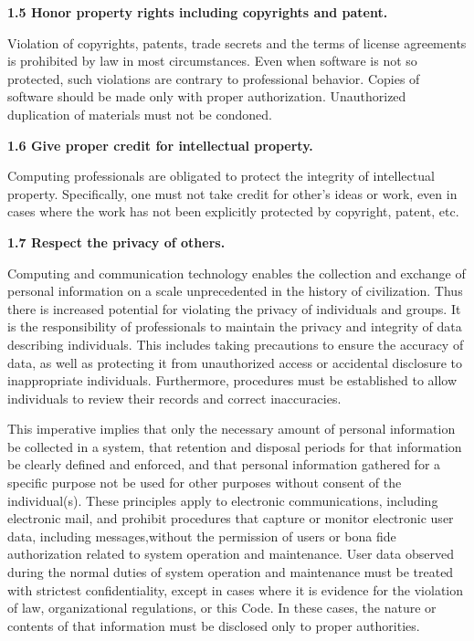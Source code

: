 \vspace{.1in}\noindent\textbf{1.5 Honor property rights including copyrights and patent.}

Violation of copyrights, patents, trade secrets and the terms of license agreements is prohibited by law in most circumstances. Even when software is not so protected, such violations are contrary to professional behavior. Copies of software should be made only with proper authorization. Unauthorized duplication of materials must not be condoned.

\vspace{.1in}\noindent\textbf{1.6 Give proper credit for intellectual property.}

Computing professionals are obligated to protect the integrity of intellectual property. Specifically, one must not take credit for other's ideas or work, even in cases where the work has not been explicitly protected by copyright, patent, etc.

\vspace{.1in}\noindent\textbf{1.7 Respect the privacy of others.}

Computing and communication technology enables the collection and exchange of personal information on a scale unprecedented in the history of civilization. Thus there is increased potential for violating the privacy of individuals and groups. It is the responsibility of professionals to maintain the privacy and integrity of data describing individuals. This includes taking precautions to ensure the accuracy of data, as well as protecting it from unauthorized access or accidental disclosure to inappropriate individuals. Furthermore, procedures must be established to allow individuals to review their records and correct inaccuracies.

This imperative implies that only the necessary amount of personal information be collected in a system, that retention and disposal periods for that information be clearly defined and enforced, and that personal information gathered for a specific purpose not be used for other purposes without consent of the individual(s). These principles apply to electronic communications, including electronic mail, and prohibit procedures that capture or monitor electronic user data, including messages,without the permission of users or bona fide authorization related to system operation and maintenance. User data observed during the normal duties of system operation and maintenance must be treated with strictest confidentiality, except in cases where it is evidence for the violation of law, organizational regulations, or this Code. In these cases, the nature or contents of that information must be disclosed only to proper authorities.

